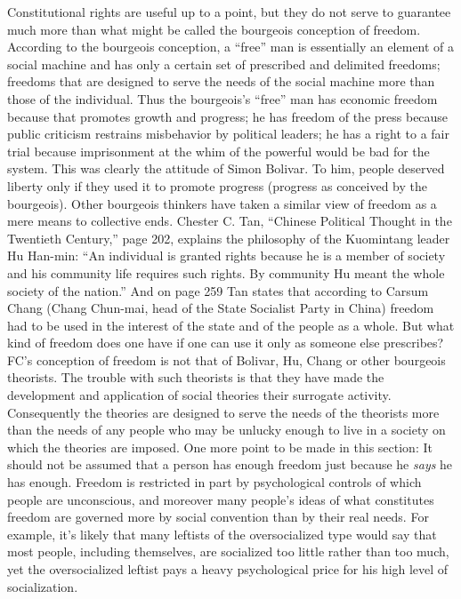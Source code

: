  Constitutional rights are useful up to a point, but they do not serve to guarantee much more than what might be called the bourgeois conception of freedom. According to the bourgeois conception, a “free” man is essentially an element of a social machine and has only a certain set of prescribed and delimited freedoms; freedoms that are designed to serve the needs of the social machine more than those of the individual. Thus the bourgeois’s “free” man has economic freedom because that promotes growth and progress; he has freedom of the press because public criticism restrains misbehavior by political leaders; he has a right to a fair trial because imprisonment at the whim of the powerful would be bad for the system. This was clearly the attitude of Simon Bolivar. To him, people deserved liberty only if they used it to promote progress (progress as conceived by the bourgeois). Other bourgeois thinkers have taken a similar view of freedom as a mere means to collective ends. Chester C. Tan, “Chinese Political Thought in the Twentieth Century,” page 202, explains the philosophy of the Kuomintang leader Hu Han-min: “An individual is granted rights because he is a member of society and his community life requires such rights. By community Hu meant the whole society of the nation.” And on page 259 Tan states that according to Carsum Chang (Chang Chun-mai, head of the State Socialist Party in China) freedom had to be used in the interest of the state and of the people as a whole. But what kind of freedom does one have if one can use it only as someone else prescribes? FC’s conception of freedom is not that of Bolivar, Hu, Chang or other bourgeois theorists. The trouble with such theorists is that they have made the development and application of social theories their surrogate activity. Consequently the theories are designed to serve the needs of the theorists more than the needs of any people who may be unlucky enough to live in a society on which the theories are imposed.
 One more point to be made in this section: It should not be assumed that a person has enough freedom just because he {\em says} he has enough. Freedom is restricted in part by psychological controls of which people are unconscious, and moreover many people’s ideas of what constitutes freedom are governed more by social convention than by their real needs. For example, it’s likely that many leftists of the oversocialized type would say that most people, including themselves, are socialized too little rather than too much, yet the oversocialized leftist pays a heavy psychological price for his high level of socialization.


